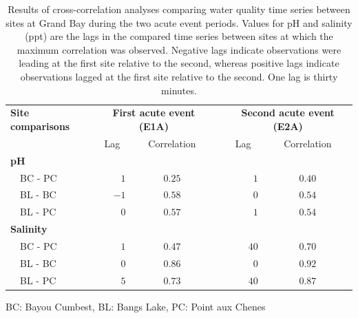 \documentclass[letterpaper,12pt]{article}\usepackage[]{graphicx}\usepackage[]{color}
\begin{document}
\begin{table}[!tbp]
\caption{Results of cross-correlation analyses comparing water quality time series between sites at Grand Bay during the two acute event periods.  Values for pH and salinity (ppt) are the lags in the compared time series between sites at which the maximum correlation was observed.  Negative lags indicate observations were leading at the first site relative to the second, whereas positive lags indicate observations lagged at the first site relative to the second.  One lag is thirty minutes.\label{tab:ccfwq}} 
\begin{center}
\begin{tabular}{lrccrc}
\hline\hline
\multicolumn{1}{l}{\bfseries Site comparisons}&\multicolumn{2}{c}{\bfseries First acute event (E1A)}&\multicolumn{1}{c}{\bfseries }&\multicolumn{2}{c}{\bfseries Second acute event (E2A)}\tabularnewline
\cline{2-3} \cline{5-6}
\multicolumn{1}{l}{}&\multicolumn{1}{c}{Lag}&\multicolumn{1}{c}{Correlation}&\multicolumn{1}{c}{}&\multicolumn{1}{c}{Lag}&\multicolumn{1}{c}{Correlation}\tabularnewline
\hline
{\bfseries pH}&&&&&\tabularnewline
~~BC - PC&$ 1$&$0.25$&&$ 1$&$0.40$\tabularnewline
~~BL - BC&$-1$&$0.58$&&$ 0$&$0.54$\tabularnewline
~~BL - PC&$ 0$&$0.57$&&$ 1$&$0.54$\tabularnewline
\hline
{\bfseries Salinity}&&&&&\tabularnewline
~~BC - PC&$ 1$&$0.47$&&$40$&$0.70$\tabularnewline
~~BL - BC&$ 0$&$0.86$&&$ 0$&$0.92$\tabularnewline
~~BL - PC&$ 5$&$0.73$&&$40$&$0.87$\tabularnewline
\hline
\end{tabular}\end{center}

\footnotesize BC: Bayou Cumbest, BL: Bangs Lake, PC: Point aux Chenes\end{table}

\clearpage
\end{document}
